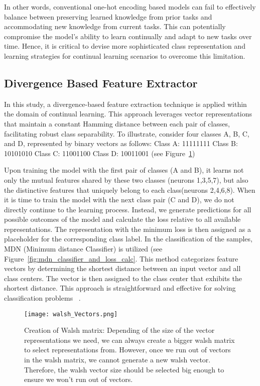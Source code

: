 \documentclass{article}
\begin{document}
In other words, conventional one-hot encoding based models can fail to effectively balance between preserving learned knowledge from prior tasks and accommodating new knowledge from current tasks. This can potentially compromise the model's ability to learn continually and adapt to new tasks over time. Hence, it is critical to devise more sophisticated class representation and learning strategies for continual learning scenarios to overcome this limitation.

\subsection{Divergence Based Feature Extractor}

In this study, a divergence-based feature extraction technique is applied within the domain of continual learning. This approach leverages vector representations that maintain a constant Hamming distance between each pair of classes, facilitating robust class separability.
To illustrate, consider four classes A, B, C, and D, represented by binary vectors as follows:
Class A: 11111111
Class B: 10101010
Class C: 11001100
Class D: 10011001
(see Figure~\ref{fig:walsh_Vectors})

Upon training the model with the first pair of classes (A and B), it learns not only the mutual features shared by these two classes (neurons 1,3,5,7), but also the distinctive features that uniquely belong to each class(neurons 2,4,6,8). When it is time to train the model with the next class pair (C and D), we do not directly continue to the learning process. Instead, we generate predictions for all possible outcomes of the model and calculate the loss relative to all available representations. The representation with the minimum loss is then assigned as a placeholder for the corresponding class label.
In the classification of the samples, MDN (Minimum distance Classifier) is utilized (see Figure~\ref{fig:mdn_classifier_and_loss_calc}. This method categorizes feature vectors by determining the shortest distance between an input vector and all class centers. The vector is then assigned to the class center that exhibits the shortest distance. This approach is straightforward and effective for solving classification problems ~\cite{mdn_classifier}.

\begin{figure}[ht]
\centering
\texttt{[image: walsh\_Vectors.png]}
\caption{Creation of Walsh matrix: Depending of the size of the vector representations we need, we can always create a bigger walsh matrix to select representations from. However, once we run out of vectors in the walsh matrix, we cannot generate a new walsh vector. Therefore, the walsh vector size should be selected big enough to ensure we won't run out of vectors. }
\label{fig:walsh_Vectors}
\end{figure}
\end{document}
